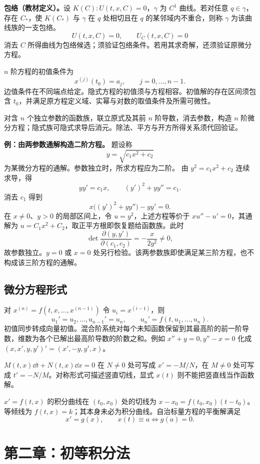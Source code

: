 \textbf{包络（教材定义）。}设 $K(C):U(t,x,C)=0$，$\gamma$ 为 $C^1$ 曲线。若对任意 $q\in\gamma$，存在 $C_*$，使 $K(C_*)$ 与 $\gamma$ 在 $q$ 处相切且在 $q$ 的某邻域内不重合，则称 $\gamma$ 为该曲线族的一支包络。
\[
U(t,x,C)=0,\qquad U_C(t,x,C)=0
\]
消去 $C$ 所得曲线为包络候选；须验证包络条件。若用其求奇解，还须验证原微分方程。

$n$ 阶方程的初值条件为
\[
x^{(j)}(t_0)=a_j,\qquad j=0,\ldots,n-1.
\]
边值条件在不同端点给定。隐式方程的初值须与方程相容。初值解的存在区间须包含 $t_0$，并满足原方程定义域、实幂与对数的取值条件及所需可微性。

对含 $n$ 个独立参数的函数族，联立原式及其前 $n$ 阶导数，消去参数，构造 $n$ 阶微分方程；隐式族可隐式求导后消元。除法、平方与开方所得关系须代回验证。


\textbf{例：由两参数通解构造二阶方程。}
题设称
\[
y=\sqrt{c_1x^2+c_2}
\]
为某微分方程的通解。参数独立时，所求方程应为二阶。
由 $y^2=c_1x^2+c_2$ 连续求导，得
\[
yy'=c_1x,\qquad (y')^2+yy''=c_1.
\]
消去 $c_1$ 得到
\[
\boxed{x\bigl((y')^2+yy''\bigr)-yy'=0.}
\]
在 $x\ne0$、$y>0$ 的局部区间上，令 $u=y^2$，上述方程等价于 $xu''-u'=0$，其通解为 $u=C_1x^2+C_2$，取正平方根即恢复题给函数族。此时
\[
\det\frac{\partial(y,y')}{\partial(c_1,c_2)}=-\frac{x}{2y^2}\ne0,
\]
故参数独立。$y=0$ 或 $x=0$ 处另行检验。该两参数族即使满足某三阶方程，也不构成该三阶方程的通解。

\subsection{微分方程形式}
对 $x^{(n)}=f(t,x,\ldots,x^{(n-1)})$ 令 $u_i=x^{(i-1)}$，则
\[
u_1'=u_2,\ldots,u_{n-1}'=u_n,\qquad u_n'=f(t,u_1,\ldots,u_n).
\]
初值同步转成向量初值。混合阶系统对每个未知函数保留到其最高阶的前一阶导数，维数为各个已解出最高阶导数的阶数之和。例如 $x''+y=0,y''-x=0$ 化成 $(x,x',y,y')'=(x',-y,y',x)$。

$M(t,x)\dd t+N(t,x)\dd x=0$ 在 $N\ne0$ 处可写成 $x'=-M/N$，在 $M\ne0$ 处可写成 $t'=-N/M$。对称形式可描述竖直切线，显式 $x(t)$ 则不能把竖直线当作函数解。

$x'=f(t,x)$ 的积分曲线在 $(t_0,x_0)$ 处的切线为 $x-x_0=f(t_0,x_0)(t-t_0)$。等倾线为 $f(t,x)=k$；其本身未必为积分曲线。自治标量方程的平衡解满足
\[
x'=g(x),\qquad x(t)\equiv a\iff g(a)=0.
\]

\section{第二章：初等积分法}
